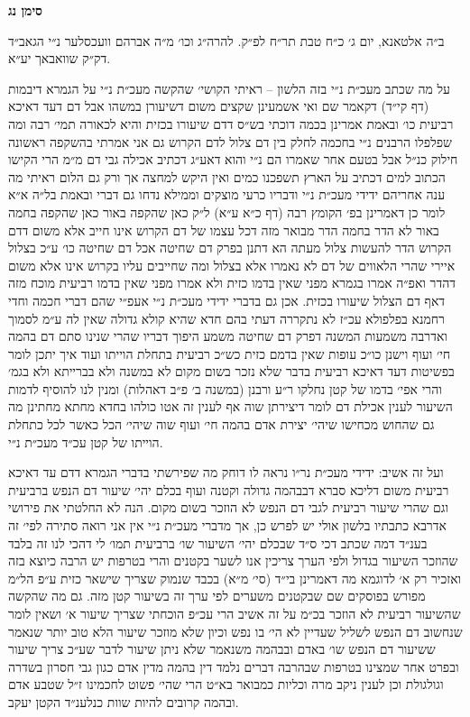 \documentclass[12pt, openany]{book}
\newcommand{\chapname}{}
\newcommand{\newchap}[1]{
	\addcontentsline{toc}{chapter}{#1}
	\renewcommand{\chapname}{#1}
		\begin{center}
			\textbf{%
\fontsize{16pt}{16pt}\selectfont
				#1}
		\end{center}
}
\begin{document}
\newchap{סימן נג}
\begin{multicols}{2}
ב״ה אלטאנא, יום ג׳ כ״ח טבת תר״ח לפ״ק. להרה״ג וכו׳ מ״ה אברהם וועכסלער נ״י הגאב״ד דק״ק שוואבאך יע״א.\\\vspace{0pt}

על מה שכתב מעכ״ת נ״י בזה הלשון – ראיתי הקושי׳ שהקשה מעכ״ת נ״י על הגמרא דיבמות (דף קי״ד) דקאמר שם ואי אשמעינן שקצים משום דשיעורן במשהו אבל דם דעד דאיכא רביעית כו׳ ובאמת אמרינן בכמה דוכתי בש״ס דדם שיעורו בכזית והיא לכאורה תמי׳ רבה ומה שפלפלו הרבנים נ״י בחכמה לחלק בין דם צלול לדם הקרוש גם אני אמרתי בהשקפה ראשונה חילוק כנ״ל אבל בטעם אחר שאמרו הם נ״י והוא דאע״ג דכתיב אכילה גבי דם מ״מ הרי הקישו הכתוב למים דכתיב על הארץ תשפכנו כמים ואין היקש למחצה אך ורק גם הלום ראיתי מה ענה אחריהם ידידי מעכ״ת נ״י ודבריו כרעי מוצקים וממילא נדחו גם דברי ובאמת בל״ה א״א לומר כן דאמרינן בפ׳ הקומץ רבה (דף כ״א ע״א) ל״ק כאן שהקפה באור כאן שהקפה בחמה באור לא הדר בחמה הדר מבואר מזה דכל עצמו של דם הקרוש אינו חייב אלא משום דדם הקרוש הדר להעשות צלול מעתה הא דתנן בפרק דם שחיטה אכל דם שחיטה כו׳ ע״כ בצלול איירי שהרי הלאווים של דם לא נאמרו אלא בצלול ומה שחייבים עליו בקרוש אינו אלא משום דהדר ואפ״ה אמרו בגמרא מפני שאין בדמו כזית ולא אמרו מפני שאין בדמו רביעית מוכח מזה דאף דם הצלול שיעורו בכזית. אכן גם בדברי ידידי מעכ״ת נ״י אעפ״י שהם דברי חכמה וחדי רחמנא בפלפולא עכ״ז לא נתקררה דעתי בהם חדא שהיא קולא גדולה שאין לה ע״מ לסמוך ואדרבה משמעות המשנה דפרק דם שחיטה משמע היפוך דבריו שהרי שנינו סתם דם בהמה חי׳ ועוף וישנן כו״כ עופות שאין בדמם כזית כש״כ רביעית בתחלת הוייתו ועוד איך יתכן לומר בפשיטות דעד דאיכא רביעית בדבר שלא נזכר בשום מקום לא במשנה ולא בברייתא ולא בגמ׳ והרי אפי׳ בדמו של קטן נחלקו ר״ע ורבנן (במשנה ב׳ פ״ב דאהלות) ומנין לנו להוסיף לדמות השיעור לענין אכילת דם לומר דיצירתן שוה אף לענין זה אטו כולהו בחדא מחתא מחתינן מה גם שהחוש מכחישו שיהי׳ יצירת אדם בהמה חי׳ ועוף שוה שיהי׳ הכל כאשר לכל כתחלת הוייתו של קטן עכ״ד מעכ״ת נ״י.\\\vspace{0pt}

ועל זה אשיב: ידידי מעכ״ת נר״ו נראה לו דוחק מה שפירשתי בדברי הגמרא דדם עד דאיכא רביעית משום דליכא סברא דבבהמה גדולה וקטנה ועוף בכלם יהי׳ שיעור דם הנפש ברביעית וגם שהרי שיעור רביעית לגבי דם הנפש לא הוזכר בשום מקום. הנה לא החלטתי את פירושי אדרבא כתבתיו בלשון אולי יש לפרש כן, אך מדברי מעכ״ת נ״י אין אני רואה סתירה לפי׳ זה בענ״ד דמה שכתב דכי ס״ד שבכלם יהי׳ השיעור שו׳ ברביעית תמו׳ לי דהכי לנו זה בלבד שהוזכר השיעור בגדול ולפי הערך צריכין אנו לשער בקטנים והרי בטרפות יש הרבה כיוצא בזה ואזכיר רק א׳ לדוגמא מה דאמרינן בי״ד (סי׳ מ״א) בכבד שנמוק שצריך שישאר כזית ע״פ הל״מ מפורש בפוסקים שם שבקטנים משערים לפי ערך זה בשיעור קטן מזה. גם מה שהקשה שהשיעור רביעית לא הוזכר בכ״מ על זה אשיב הרי עכ״פ הוכחתי שצריך שיעור א׳ ושאין לומר שנחשוב דם הנפש לשליל שעדיין לא הי׳ בו נפש וכיון שלא מוזכר שיעור הלא טוב יותר שנאמר ששיעור דם הנפש שו׳ באדם ובבהמה משנאמר שלא ניתן שיעור לדבר שע״כ צריך שיעור ובפרט אחר שמצינו בטרפות שבהרבה דברים נלמד דין בהמה מדין אדם כגון גבי חסרון בשדרה וגולגולת וכן לענין ניקב מרה וכליות כמבואר בא״ט הרי שהי׳ פשוט לחכמינו ז״ל שטבע אדם ובהמה קרובים להיות שוות כנלענ״ד הקטן יעקב.\\\vspace{0pt}

\end{multicols}\newpage
\end{document}
